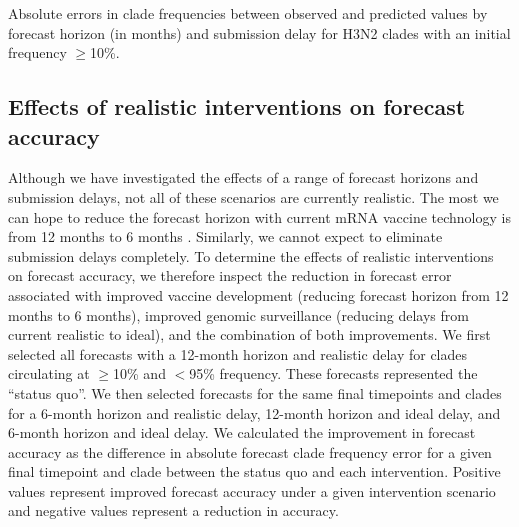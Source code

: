 \documentclass[9pt,lineno]{elife}
\begin{document}
\begin{table}[htb]
  \begin{center}
    
    \caption{Absolute errors in clade frequencies between observed and predicted values by forecast horizon (in months) and submission delay for H3N2 clades with an initial frequency $\geq$10\%.}
    \label{tab:h3n2_absolute_forecast_clade_frequency_errors}
  \end{center}
\end{table}

\subsection{Effects of realistic interventions on forecast accuracy}

Although we have investigated the effects of a range of forecast horizons and submission delays, not all of these scenarios are currently realistic.
The most we can hope to reduce the forecast horizon with current mRNA vaccine technology is from 12 months to 6 months \citep{Grant2023}.
Similarly, we cannot expect to eliminate submission delays completely.
To determine the effects of realistic interventions on forecast accuracy, we therefore inspect the reduction in forecast error associated with improved vaccine development (reducing forecast horizon from 12 months to 6 months), improved genomic surveillance (reducing delays from current realistic to ideal), and the combination of both improvements.
We first selected all forecasts with a 12-month horizon and realistic delay for clades circulating at $\ge$10\% and $<$95\% frequency.
These forecasts represented the ``status quo''.
We then selected forecasts for the same final timepoints and clades for a 6-month horizon and realistic delay, 12-month horizon and ideal delay, and 6-month horizon and ideal delay.
We calculated the improvement in forecast accuracy as the difference in absolute forecast clade frequency error for a given final timepoint and clade between the status quo and each intervention.
Positive values represent improved forecast accuracy under a given intervention scenario and negative values represent a reduction in accuracy.
\end{document}
